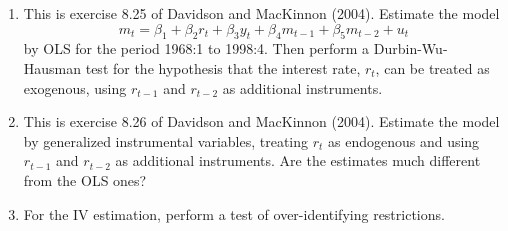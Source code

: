 \documentclass{article}
\begin{document}
\begin{enumerate}
\item This is exercise 8.25 of Davidson and MacKinnon (2004). Estimate the
model
\begin{equation*}
m_{t}=\beta _{1}+\beta _{2}r_{t}+\beta _{3}y_{t}+\beta _{4}m_{t-1}+\beta
_{5}m_{t-2}+u_{t}
\end{equation*}%
by OLS for the period 1968:1 to 1998:4. Then perform a Durbin-Wu-Hausman
test for the hypothesis that the interest rate, $r_{t}$, can be treated as
exogenous, using $r_{t-1}$ and $r_{t-2}$ as additional instruments.

\item This is exercise 8.26 of Davidson and MacKinnon (2004). Estimate the
model by generalized instrumental variables, treating $r_{t}$ as endogenous
and using $r_{t-1}$ and $r_{t-2}$ as additional instruments. Are the
estimates much different from the OLS ones?

\item For the IV estimation, perform a test of over-identifying restrictions.
\end{enumerate}
\end{document}
